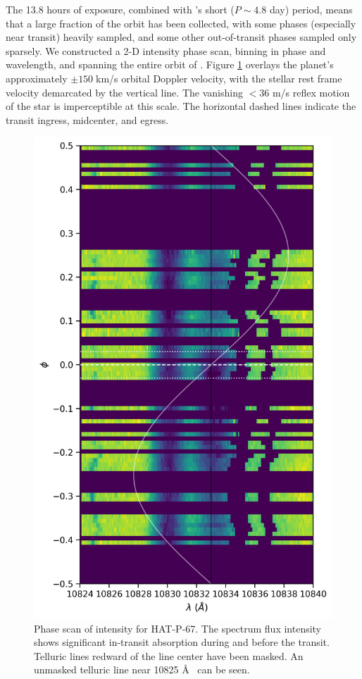 \documentclass[twocolumn]{aastex631}
\begin{document}
The 13.8 hours of exposure, combined with 's short ($P\sim4.8$ day) period, means that a large fraction of the orbit has been collected, with some phases (especially near transit) heavily sampled, and some other out-of-transit phases sampled only sparsely. We constructed a 2-D intensity phase scan, binning in phase and wavelength, and spanning the entire orbit of .  Figure \ref{fig:HPFphase2D} overlays the planet's approximately $\pm150\;$km/s orbital Doppler velocity, with the stellar rest frame velocity demarcated by the vertical line.  The vanishing $<36$ m/s reflex motion of the star is imperceptible at this scale.  The horizontal dashed lines indicate the transit ingress, midcenter, and egress.

\begin{figure}
    \includegraphics[width=0.8\linewidth]{figures/phase_2D_diagram.png}
    \caption{Phase scan of intensity for HAT-P-67.  The spectrum flux intensity shows significant in-transit absorption during and before the transit.  Telluric lines redward of the line center have been masked.  An unmasked telluric line near 10825 \AA~ can be seen.}
    \label{fig:HPFphase2D}
\end{figure}
\end{document}
